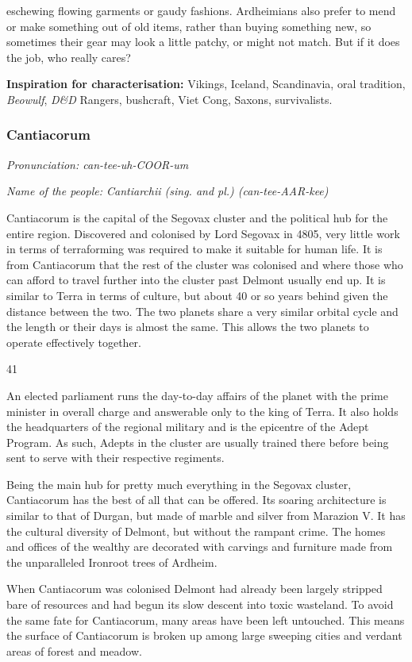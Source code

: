 eschewing flowing garments or gaudy fashions. Ardheimians also prefer to mend or make something out of old items, rather than buying something new, so sometimes their gear may look a little patchy, or might not match. But if it does the job, who really cares?

\textbf{Inspiration for characterisation:} Vikings, Iceland, Scandinavia, oral tradition, \textit{Beowulf}, \textit{D\&D} Rangers, bushcraft, Viet Cong, Saxons, survivalists.

\subsubsection{Cantiacorum}

\textit{Pronunciation: can-tee-uh-COOR-um}

\textit{Name of the people: Cantiarchii (sing. and pl.) (can-tee-AAR-kee)}

Cantiacorum is the capital of the Segovax cluster and the political hub for the entire region. Discovered and colonised by Lord Segovax in 4805, very little work in terms of terraforming was required to make it suitable for human life. It is from Cantiacorum that the rest of the cluster was colonised and where those who can afford to travel further into the cluster past Delmont usually end up. It is similar to Terra in terms of culture, but about 40 or so years behind given the distance between the two. The two planets share a very similar orbital cycle and the length or their days is almost the same. This allows the two planets to operate effectively together.

41

An elected parliament runs the day-to-day affairs of the planet with the prime minister in overall charge and answerable only to the king of Terra. It also holds the headquarters of the regional military and is the epicentre of the Adept Program. As such, Adepts in the cluster are usually trained there before being sent to serve with their respective regiments.

Being the main hub for pretty much everything in the Segovax cluster, Cantiacorum has the best of all that can be offered. Its soaring architecture is similar to that of Durgan, but made of marble and silver from Marazion V. It has the cultural diversity of Delmont, but without the rampant crime. The homes and offices of the wealthy are decorated with carvings and furniture made from the unparalleled Ironroot trees of Ardheim.

When Cantiacorum was colonised Delmont had already been largely stripped bare of resources and had begun its slow descent into toxic wasteland. To avoid the same fate for Cantiacorum, many areas have been left untouched. This means the surface of Cantiacorum is broken up among large sweeping cities and verdant areas of forest and meadow.

